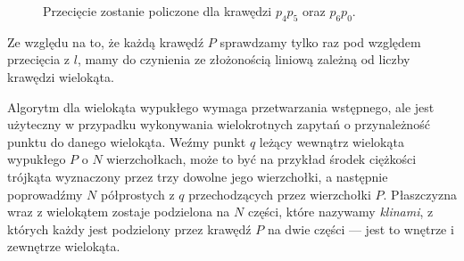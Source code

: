 \begin{figure}[htp]
  \centering
  \caption{Przecięcie zostanie policzone dla krawędzi $p_{4}p_{5}$
    oraz $p_{6}p_{0}$.}
\end{figure}

Ze względu na to, że każdą krawędź $P$ sprawdzamy tylko raz
pod względem przecięcia z $l$, mamy do czynienia ze złożonością
liniową zależną od liczby krawędzi wielokąta.

Algorytm dla wielokąta wypukłego wymaga przetwarzania wstępnego, ale
jest użyteczny w przypadku wykonywania wielokrotnych zapytań o
przynależność punktu do danego wielokąta. Weźmy punkt $q$ leżący
wewnątrz wielokąta wypukłego $P$ o $N$ wierzchołkach, może to być na
przykład środek ciężkości trójkąta wyznaczony przez trzy dowolne jego
wierzchołki, a następnie poprowadźmy $N$ półprostych z $q$
przechodzących przez wierzchołki $P$. Płaszczyzna wraz z wielokątem
zostaje podzielona na $N$ części, które nazywamy \emph{klinami}, z
których każdy jest podzielony przez krawędź $P$ na dwie części ---
jest to wnętrze i zewnętrze wielokąta.


